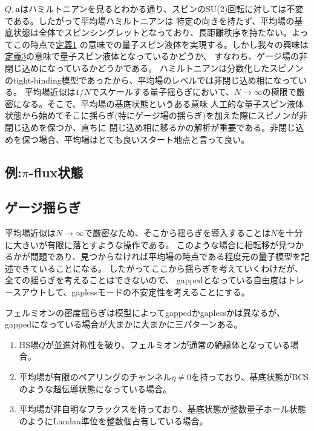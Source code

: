 \documentclass[11pt, aps, longbibliography]{article}
\begin{document}
        $Q,\boldsymbol{a}$はハミルトニアンを見るとわかる通り、スピンのSU(2)回転に対しては不変である。したがって平均場ハミルトニアンは
        特定の向きを持たず、平均場の基底状態は全体でスピンシングレットとなっており、長距離秩序を持たない。よってこの時点で\hyperlink{def1}{定義1}
        の意味での量子スピン液体を実現する。しかし我々の興味は\hyperlink{def3}{定義3}の意味で量子スピン液体となっているかどうか、
        すなわち、ゲージ場の非閉じ込めになっているかどうかである。
        ハミルトニアンは分数化したスピノンのtight-binding模型であったから、平均場のレベルでは非閉じ込め相になっている。
        平均場近似は$1/N$でスケールする量子揺らぎにおいて、$N\rightarrow \infty$の極限で厳密になる。そこで、平均場の基底状態というある意味
        人工的な量子スピン液体状態から始めてそこに揺らぎ(特にゲージ場の揺らぎ)を加えた際にスピノンが非閉じ込めを保つか、直ちに
        閉じ込め相に移るかの解析が重要である。非閉じ込めを保つ場合、平均場はとても良いスタート地点と言って良い。
        
    \subsection{例:$\pi$-flux状態}


    \subsection{ゲージ揺らぎ}
    平均場近似は$N\rightarrow \infty$で厳密なため、そこから揺らぎを導入することは$N$を十分に大きいが有限に落とすような操作である。
    このような場合に相転移が見つかるかが問題であり、見つからなければ平均場の時点である程度元の量子模型を記述できていることになる。
    したがってここから揺らぎを考えていくわけだが、全ての揺らぎを考えることはできないので、
    gappedとなっている自由度はトレースアウトして、gaplessモードの不安定性を考えることにする。

    フェルミオンの密度揺らぎは模型によってgappedかgaplessかは異なるが、gappedになっている場合が大まかに大まかに三パターンある。
    \begin{enumerate}
        \item HS場$Q$が並進対称性を破り、フェルミオンが通常の絶縁体となっている場合。
        \item 平均場が有限のペアリングのチャンネル$\eta \neq 0$を持っており、基底状態がBCSのような超伝導状態になっている場合。
        \item 平均場が非自明なフラックスを持っており、基底状態が整数量子ホール状態のようにLandau準位を整数個占有している場合。
    \end{enumerate}
\end{document}
